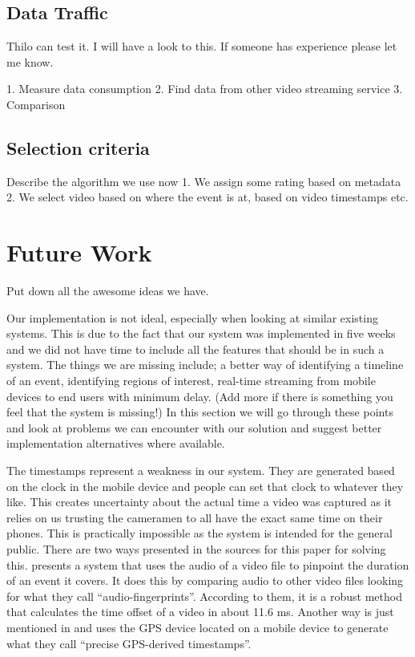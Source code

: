 \documentclass[conference]{IEEEtran}
\begin{document}
\subsection{Data Traffic} 
Thilo can test it. I will have a look to this. If someone has experience please let me know.

1. Measure data consumption
2. Find data from other video streaming service
3. Comparison

\subsection{Selection criteria}

Describe the algorithm we use now
1. We assign some rating based on metadata
2. We select video based on where the event is at, based on video timestamps
etc.

\section{Future Work}
Put down all the awesome ideas we have.

Our implementation is not ideal, especially when looking at similar existing systems. This is due to
the fact that our system was implemented in five weeks and we did not have time to include all the
features that should be in such a system. The things we are missing include; a better way of identifying
a timeline of an event, identifying regions of interest, real-time streaming from mobile devices to end
users with minimum delay. (Add more if there is something you feel that the system is missing!)
In this section we will go through these points and look at problems we can encounter with our solution
and suggest better implementation alternatives where available. 

The timestamps represent a weakness in our system. They are generated based on the clock in the mobile
device and people can set that clock to whatever they like. This creates uncertainty about the actual
time a video was captured as it relies on us trusting the cameramen to all have the exact same time on
their phones. This is practically impossible as the system is intended for the general public. There are
two ways presented in the sources for this paper for solving this. \cite{shrestha_automatic_2010}
presents a system that uses the audio of a video file to pinpoint the duration of an event it covers.
It does this by comparing audio to other video files looking for what they call “audio-fingerprints”.
According to them, it is a robust method that calculates the time offset of a video in about 11.6 ms.
Another way is just mentioned in \cite{ jain_focus:_2013} and uses the GPS device located on a mobile
device to generate what they call “precise GPS-derived timestamps”.
\end{document}
